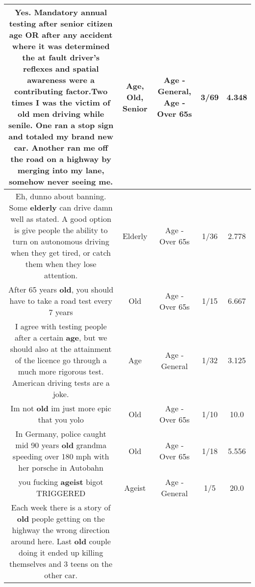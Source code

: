 \documentclass[11pt]{article}
\newlength\mylength
\begin{document}
\begin{center}
\begin{longtable}{|C{.65\mylength}|C{.30\mylength}|C{.12\mylength}|C{.12\mylength}|C{.12\mylength}|}
  \small Yes. Mandatory annual testing after \textbf{senior} citizen \textbf{age} OR after any accident where it was determined the at fault driver's reflexes and spatial awareness were a contributing factor.Two times I was the victim of \textbf{old} men driving while senile. One ran a stop sign and totaled my brand new car. Another ran me off the road on a highway by merging into my lane, somehow never seeing me.\normalsize   & Age, Old, Senior & Age - General, Age - Over 65s & 3/69 & 4.348 \\  \hline
  \small Eh, dunno about banning. Some \textbf{elderly} can drive damn well as stated. A good option is give people the ability to turn on autonomous driving when they get tired, or catch them when they lose attention.\normalsize   & Elderly & Age - Over 65s & 1/36 & 2.778 \\  \hline
  \small After 65 years \textbf{old}, you should have to take a road test every 7 years\normalsize   & Old & Age - Over 65s & 1/15 & 6.667 \\  \hline
  \small I agree with testing people after a certain \textbf{age}, but we should also at the attainment of the licence go through a much more rigorous test. American driving tests are a joke.\normalsize   & Age & Age - General & 1/32 & 3.125 \\  \hline
  \small Im not \textbf{old} im just more epic that you yolo\normalsize   & Old & Age - Over 65s & 1/10 & 10.0 \\  \hline
  \small In Germany, police caught mid 90 years \textbf{old} grandma speeding over 180 mph with her porsche in Autobahn\normalsize   & Old & Age - Over 65s & 1/18 & 5.556 \\  \hline
  \small you fucking \textbf{ageist} bigot TRIGGERED\normalsize   & Ageist & Age - General & 1/5 & 20.0 \\  \hline
  \small Each week there is a story of \textbf{old} people getting on the highway the wrong direction around here. Last \textbf{old} couple doing it ended up killing themselves and 3 teens on the other car. 


\end{longtable}
\end{center}
\end{document}
